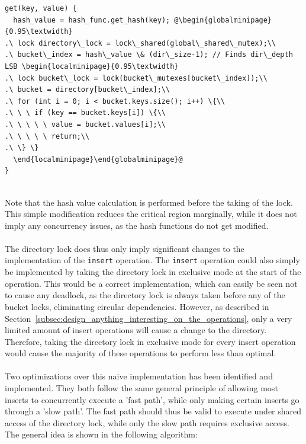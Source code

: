\documentclass[11pt]{article} %
\begin{document}
\begin{fminipage}{\linewidth}
\begin{lstlisting}[escapechar=@]
get(key, value) {
  hash_value = hash_func.get_hash(key); @\begin{globalminipage}{0.95\textwidth}
.\ lock directory\_lock = lock\_shared(global\_shared\_mutex);\\
.\ bucket\_index = hash\_value \& (dir\_size-1); // Finds dir\_depth LSB \begin{localminipage}{0.95\textwidth}
.\ lock bucket\_lock = lock(bucket\_mutexes[bucket\_index]);\\
.\ bucket = directory[bucket\_index];\\
.\ for (int i = 0; i < bucket.keys.size(); i++) \{\\
.\ \ \ if (key == bucket.keys[i]) \{\\
.\ \ \ \ \ value = bucket.values[i];\\
.\ \ \ \ \ return;\\
.\ \} \}
  \end{localminipage}\end{globalminipage}@
}
\end{lstlisting}
\end{fminipage}
\vphantom{fill}\\
Note that the hash value calculation is performed before the taking of the lock. This simple modification reduces the critical region marginally, while it does not imply any concurrency issues, as the hash functions do not get modified.\\
\\
The directory lock does thus only imply significant changes to the implementation of the \verb|insert| operation. The \verb|insert| operation could also simply be implemented by taking the directory lock in exclusive mode at the start of the operation. This would be a correct implementation, which can easily be seen not to cause any deadlock, as the directory lock is always taken before any of the bucket locks, eliminating circular dependencies. However, as described in Section~\ref{subsec:design_anything_interesting_on_the_operations}, only a very limited amount of insert operations will cause a change to the directory. Therefore, taking the directory lock in exclusive mode for every insert operation would cause the majority of these operations to perform less than optimal. \\
\\
Two optimizations over this naive implementation has been identified and implemented. They both follow the same general principle of allowing most inserts to concurrently execute a 'fast path', while only making certain inserts go through a 'slow path'. The fast path should thus be valid to execute under shared access of the directory lock, while only the slow path requires exclusive access. The general idea is shown in the following algorithm: \\
\end{document}
